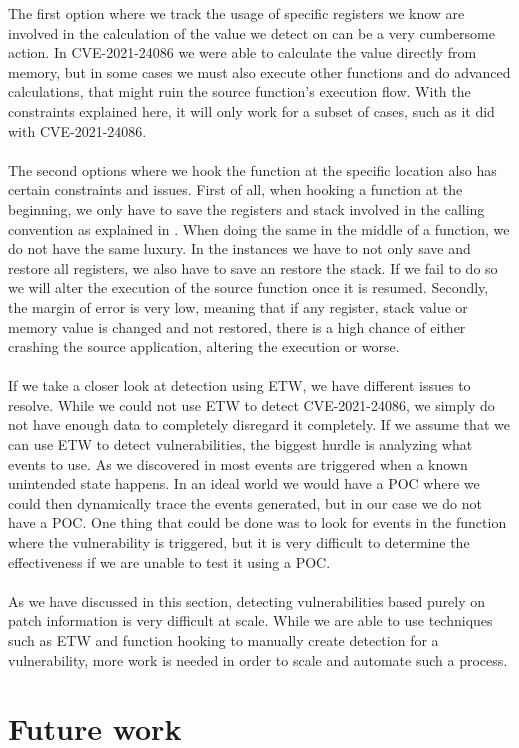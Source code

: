 \documentclass{report}
\begin{document}
The first option where we track the usage of specific registers we know are involved in the calculation of the value we detect on can be a very cumbersome action. In CVE-2021-24086 we were able to calculate the value directly from memory, but in some cases we must also execute other functions and do advanced calculations, that might ruin the source function's execution flow. With the constraints explained here, it will only work for a subset of cases, such as it did with CVE-2021-24086.
\\
\\
The second options where we hook the function at the specific location also has certain constraints and issues. First of all, when hooking a function at the beginning, we only have to save the registers and stack involved in the calling convention as explained in . When doing the same in the middle of a function, we do not have the same luxury. In the instances we have to not only save and restore all registers, we also have to save an restore the stack. If we fail to do so we will alter the execution of the source function once it is resumed. Secondly, the margin of error is very low, meaning that if any register, stack value or memory value is changed and not restored, there is a high chance of either crashing the source application, altering the execution or worse.
\\
\\
If we take a closer look at detection using \gls{ETW}, we have different issues to resolve. While we could not use \gls{ETW} to detect CVE-2021-24086, we simply do not have enough data to completely disregard it completely. If we assume that we can use \gls{ETW} to detect vulnerabilities, the biggest hurdle is analyzing what events to use. As we discovered in  most events are triggered when a known unintended state happens. In an ideal world we would have a \gls{POC} where we could then dynamically trace the events generated, but in our case we do not have a \gls{POC}. One thing that could be done was to look for events in the function where the vulnerability is triggered, but it is very difficult to determine the effectiveness if we are unable to test it using a \gls{POC}.
\\
\\
As we have discussed in this section, detecting vulnerabilities based purely on patch information is very difficult at scale. While we are able to use techniques such as \gls{ETW} and function hooking to manually create detection for a vulnerability, more work is needed in order to scale and automate such a process.

\section{Future work}
\end{document}
